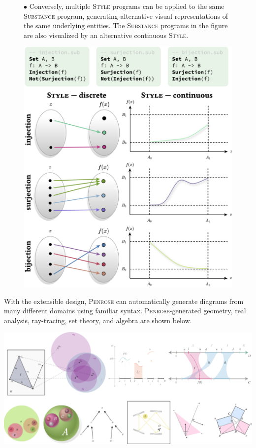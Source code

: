 \documentclass[12pt]{cmuthesis}
\newcommand*{\Penrose}{\textsc{Penrose}\xspace}
\newcommand*{\Substance}{\textsc{Substance}\xspace}
\newcommand*{\Style}{\textsc{Style}\xspace}
\begin{document}
\begin{figure}[h]
\begin{minipage}[b]{0.48\linewidth}
$\bullet$ Conversely, multiple \Style{} programs can be applied to the same \Substance{} program, generating alternative visual representations of the same underlying entities. The \Substance programs in the figure are also visualized by an alternative continuous \Style.
\end{minipage}
\hfill
\begin{minipage}[b]{0.5\linewidth}
    \centering
    \includegraphics[width=\textwidth]{assets/chapter-2/injection-surjection-bijection.pdf}
\end{minipage}
\end{figure}
    
With the extensible design, \Penrose can automatically generate diagrams from many different domains using familiar syntax. \Penrose-generated geometry, real analysis, ray-tracing, set theory, and algebra are shown below.

\vspace{10pt}
\includegraphics[width=0.95\linewidth]{assets/chapter-2/gallery.pdf}
\end{document}

